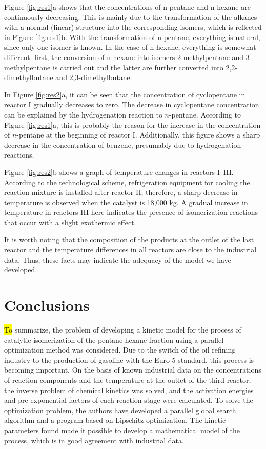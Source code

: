 \documentclass[mathematics,article,accept,pdftex,moreauthors]{Definitions/mdpi}
\begin{document}
	Figure \ref{fig:res1}a shows that the concentrations of n-pentane and n-hexane are continuously decreasing. This is mainly due to the transformation of the alkanes with a normal (linear) structure into the corresponding isomers, which is reflected in Figure \ref{fig:res1}b. With the transformation of n-pentane, everything is natural, since only one isomer is known. In the case of n-hexane, everything is somewhat different: first, the conversion of n-hexane into isomers 2-methylpentane and 3-methylpentane is carried out and the latter are further converted into 2,2-dimethylbutane and 2,3-dimethylbutane.
	
	In Figure \ref{fig:res2}a, it can be seen that the concentration of cyclopentane in reactor I gradually decreases to zero.  The decrease in cyclopentane concentration can be explained by the hydrogenation reaction to $n$-pentane. According to Figure \ref{fig:res1}a, this is probably the reason for the increase in the concentration of $n$-pentane at the beginning of reactor I.
	Additionally, this figure shows a sharp decrease in the concentration of benzene, presumably due to hydrogenation reactions.
	
	Figure \ref{fig:res2}b shows a graph of temperature changes in reactors I--III. According to the technological scheme, refrigeration equipment for cooling the reaction mixture is installed after reactor II; {therefore, a sharp decrease in temperature is observed when the catalyst is 18,000 kg}. A gradual increase in temperature in reactors III here indicates the presence of isomerization reactions that occur with a slight exothermic effect.
	
	It is worth noting that the composition of the products at the outlet of the last reactor and the temperature differences in all reactors are close to the industrial data. Thus, these facts may indicate the adequacy of the model we have developed.
	
	\section{Conclusions}\label{sec_conclusion}
	
	\hl{To} %
 summarize, the problem of developing a kinetic model for the process of catalytic isomerization of the pentane-hexane fraction using a parallel optimization method was considered. Due to the switch of the oil refining industry to the production of gasoline with  the Euro-5 standard, this process is becoming important. On the basis of known industrial data on the concentrations of reaction components and the temperature at the outlet of the third reactor, the inverse problem of chemical kinetics was solved, and the activation energies and pre-exponential factors of each reaction stage were calculated. To solve the optimization problem, the authors have developed a parallel global search algorithm and a program based on Lipschitz optimization. The kinetic parameters found made it possible to develop a mathematical model of the process, which is in good agreement with industrial data.
	
\end{document}

